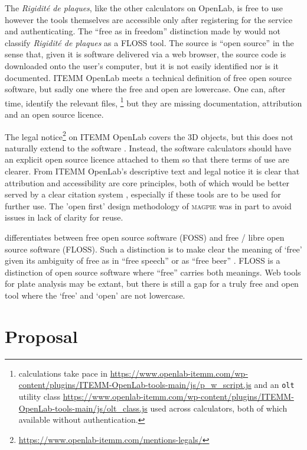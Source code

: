 The \textit{Rigidité de plaques}, like the other calculators on OpenLab, is free to use however the tools themselves are accessible only after registering for the service and authenticating. 
The ``free as in freedom'' distinction made by \textcite{stallman_why_2007} would not classify \textit{Rigidité de plaques} as a FLOSS tool. 
The source is ``open source'' in the sense that, given it is software delivered via a web browser, the source code is downloaded onto the user's computer, but it is not easily identified nor is it documented.
ITEMM OpenLab meets a technical definition of free open source software, but sadly one where the free and open are lowercase.
One can, after time, identify the relevant files,
\footnote{calculations take pace in \url{https://www.openlab-itemm.com/wp-content/plugins/ITEMM-OpenLab-tools-main/js/p_w_script.js} and an \texttt{olt} utility class \url{https://www.openlab-itemm.com/wp-content/plugins/ITEMM-OpenLab-tools-main/js/olt_class.js} used across calculators, both of which available without authentication.} 
but they are missing documentation, attribution and an open source licence. 

The legal notice\footnote{\url{https://www.openlab-itemm.com/mentions-legals/}} on ITEMM OpenLab covers the 3D objects, but this does not naturally extend to the software \cite{cc_can_2025}. Instead, the software calculators should have an explicit open source licence attached to them so that there terms of use are clearer. From ITEMM OpenLab's descriptive text and legal notice it is clear that attribution and accessibility are core principles, both of which would be better served by a clear citation system \cite{soito_citations_2016}, especially if these tools are to be used for further use.
The 'open first' design methodology of \textsc{magpie} was in part to avoid issues in lack of clarity for reuse.

\textcite{stallman_floss_2021} differentiates between free open source software (FOSS) and free / libre open source  software (FLOSS). Such a distinction is to make clear the meaning of `free' given its ambiguity of free as in ``free speech'' or as ``free beer'' \cite{stallman_why_2007}. FLOSS is a distinction of open source software where ``free'' carries both meanings.
Web tools for plate analysis may be extant, but there is still a gap for a truly free and open tool where the `free' and `open' are not lowercase.


\section{Proposal}

